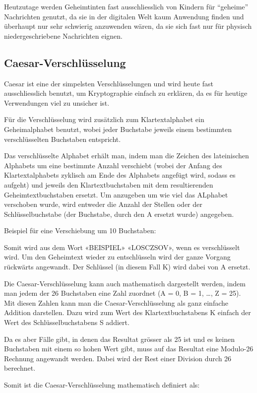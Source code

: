 Heutzutage werden Geheimtinten fast ausschliesslich von Kindern für \enquote{geheime} Nachrichten genutzt, da sie in der digitalen Welt kaum Anwendung finden und überhaupt nur sehr schwierig anzuwenden wären, da sie sich fast nur für physisch niedergeschriebene Nachrichten eignen.

\newpage %
\subsection {Caesar-Verschlüsselung}

Caesar ist eine der simpelsten Verschlüsselungen und wird heute fast ausschliesslich benutzt, um Kryptographie einfach zu erklären, da es für heutige Verwendungen viel zu unsicher ist. 

Für die Verschlüsselung wird zusätzlich zum Klartextalphabet ein Geheimalphabet benutzt, wobei jeder Buchstabe jeweils einem bestimmten verschlüsselten Buchstaben entspricht.

Das verschlüsselte Alphabet erhält man, indem man die Zeichen des lateinischen Alphabets um eine bestimmte Anzahl verschiebt (wobei der Anfang des Klartextalphabets zyklisch am Ende des Alphabets angefügt wird, sodass es aufgeht) und jeweils den Klartextbuchstaben mit dem resultierenden Geheimtextbuchstaben ersetzt. Um anzugeben um wie viel das ALphabet verschoben wurde, wird entweder die Anzahl der Stellen oder der Schlüsselbuchstabe (der Buchstabe, durch den A ersetzt wurde) angegeben. 

Beispiel für eine Verschiebung um 10 Buchstaben:

Somit wird aus dem Wort «BEISPIEL» «LOSCZSOV», wenn es verschlüsselt wird. Um den Geheimtext wieder zu entschlüsseln wird der ganze Vorgang rückwärts angewandt. Der Schlüssel (in diesem Fall K) wird dabei von A ersetzt.

Die Caesar-Verschlüsselung kann auch mathematisch dargestellt werden, indem man jedem der 26 Buchstaben eine Zahl zuordnet (A = 0, B = 1, …, Z = 25). Mit diesen Zahlen kann man die Caesar-Verschlüsselung als ganz einfache Addition darstellen. Dazu wird zum Wert des Klartextbuchstabens K einfach der Wert des Schlüsselbuchstabens S addiert.

Da es aber Fälle gibt, in denen das Resultat grösser als 25 ist und es keinen Buchstaben mit einem so hohen Wert gibt, muss auf das Resultat eine Modulo-26 Rechnung angewandt werden. Dabei wird der Rest einer Division durch 26 berechnet.

Somit ist die Caesar-Verschlüsselung mathematisch definiert als:


